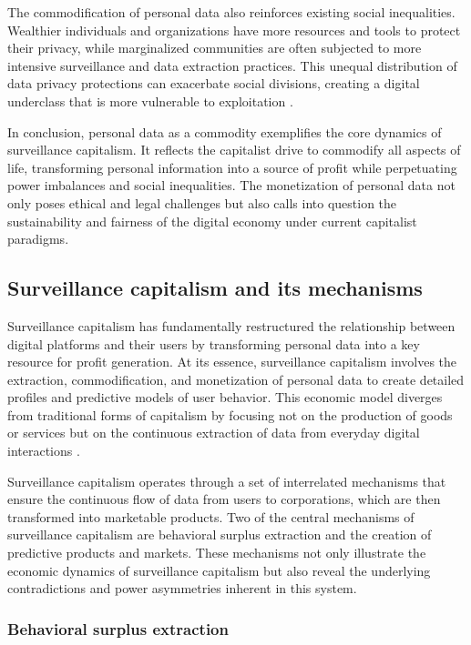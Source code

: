 The commodification of personal data also reinforces existing social inequalities. Wealthier individuals and organizations have more resources and tools to protect their privacy, while marginalized communities are often subjected to more intensive surveillance and data extraction practices. This unequal distribution of data privacy protections can exacerbate social divisions, creating a digital underclass that is more vulnerable to exploitation \cite[pp.~66-69]{noble2018algorithms}.

In conclusion, personal data as a commodity exemplifies the core dynamics of surveillance capitalism. It reflects the capitalist drive to commodify all aspects of life, transforming personal information into a source of profit while perpetuating power imbalances and social inequalities. The monetization of personal data not only poses ethical and legal challenges but also calls into question the sustainability and fairness of the digital economy under current capitalist paradigms.

\subsection{Surveillance capitalism and its mechanisms}

Surveillance capitalism has fundamentally restructured the relationship between digital platforms and their users by transforming personal data into a key resource for profit generation. At its essence, surveillance capitalism involves the extraction, commodification, and monetization of personal data to create detailed profiles and predictive models of user behavior. This economic model diverges from traditional forms of capitalism by focusing not on the production of goods or services but on the continuous extraction of data from everyday digital interactions \cite[pp.~8-10]{zuboff2020age}.

Surveillance capitalism operates through a set of interrelated mechanisms that ensure the continuous flow of data from users to corporations, which are then transformed into marketable products. Two of the central mechanisms of surveillance capitalism are behavioral surplus extraction and the creation of predictive products and markets. These mechanisms not only illustrate the economic dynamics of surveillance capitalism but also reveal the underlying contradictions and power asymmetries inherent in this system.

\subsubsection{Behavioral surplus extraction}

